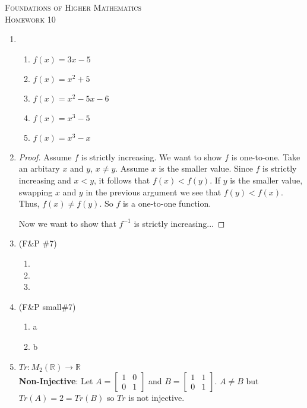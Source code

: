 \documentclass{article}
\theoremstyle{problem}
\theoremstyle{plain}
\theoremstyle{remark}
\begin{document}
\begin{center}
\textsc{\Large Foundations of Higher Mathematics}\\[.3cm]
\textsc{\Large Homework 10}
\end{center}

\begin{enumerate}
  \item 
    \begin{enumerate} 
    \item $f(x) = 3x - 5$
    \item $f(x) = x^2 + 5$
    \item $f(x) = x^2 - 5x - 6$
    \item $f(x) = x^3 - 5$
    \item $f(x) = x^3 - x$        
    \end{enumerate}

    \item 
      \begin{proof}
        Assume $f$ is strictly increasing. 
        We want to show $f$ is one-to-one. 
        Take an arbitary $x$ and $y$, $x \not = y$. 
        Assume $x$ is the smaller value.
        Since $f$ is strictly increasing and $x < y$, it follows that $f(x) < f(y)$.
        If $y$ is the smaller value, 
        swapping $x$ and $y$ in the previous argument we see that $f(y) < f(x)$.
        Thus, $f(x) \not = f(y)$. 
        So $f$ is a one-to-one function. 

        Now we want to show that $f^{-1}$ is strictly increasing...
      \end{proof}

    \item (F\&P {\small\#}7)
      \begin{enumerate} 
      \item
      \item
      \item
      \end{enumerate}

    \item (F\&P {small\#}7)
      \begin{enumerate} %
        \item a
        \item b
      \end{enumerate} 
    \item $Tr : M_2(\mathbb{R}) \to \mathbb{R}$\\
      \textbf{Non-Injective}: Let $A = 
      \begin{bmatrix}
        1 & 0\\
        0 & 1
      \end{bmatrix}$
      and $B =
      \begin{bmatrix}
        1 & 1\\
        0 & 1
      \end{bmatrix}$. $A \not = B$ but $Tr(A) = 2 = Tr(B)$ so $Tr$ is not injective.\\


\end{enumerate}
\end{document}

